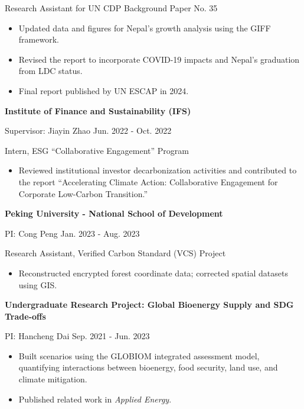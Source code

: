 \documentclass[UTF8]{ctexbook}
\begin{document}
\quad Research Assistant for UN CDP Background Paper No. 35

\begin{itemize}[leftmargin=1.5em, itemsep=2pt, topsep=4pt]
    \item Updated data and figures for Nepal's growth analysis using the GIFF framework.
    \item Revised the report to incorporate COVID-19 impacts and Nepal's graduation from LDC status.
    \item Final report published by UN ESCAP in 2024.
\end{itemize}

\textbf{Institute of Finance and Sustainability (IFS)}

\quad Supervisor: Jiayin Zhao \hfill Jun. 2022 - Oct. 2022

\quad Intern, ESG ``Collaborative Engagement'' Program

\begin{itemize}[leftmargin=1.5em, itemsep=2pt, topsep=4pt]
    \item Reviewed institutional investor decarbonization activities and contributed to the report ``Accelerating Climate Action: Collaborative Engagement for Corporate Low-Carbon Transition.''
\end{itemize}

\textbf{Peking University - National School of Development}

\quad PI: Cong Peng \hfill Jan. 2023 - Aug. 2023

\quad Research Assistant, Verified Carbon Standard (VCS) Project

\begin{itemize}[leftmargin=1.5em, itemsep=2pt, topsep=4pt]
    \item Reconstructed encrypted forest coordinate data; corrected spatial datasets using GIS.
\end{itemize}

\textbf{Undergraduate Research Project: Global Bioenergy Supply and SDG Trade-offs}

\quad PI: Hancheng Dai \hfill Sep. 2021 - Jun. 2023

\begin{itemize}[leftmargin=1.5em, itemsep=2pt, topsep=4pt]
    \item Built scenarios using the GLOBIOM integrated assessment model, quantifying interactions between bioenergy, food security, land use, and climate mitigation.
    \item Published related work in \textit{Applied Energy}.
\end{itemize}
\end{document}
